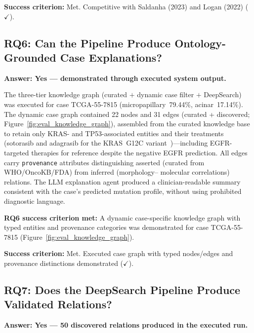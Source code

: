 \textbf{Success criterion:} Met.
Competitive with Saldanha (2023) and Logan (2022) ($\checkmark$).

\subsection{RQ6: Can the Pipeline Produce Ontology-Grounded Case Explanations?}
\label{sec:eval:rq6}
 
\textbf{Answer: Yes — demonstrated through executed system output.}
 
The three-tier knowledge graph (curated $+$ dynamic case filter $+$
DeepSearch) was executed for case TCGA-55-7815 (micropapillary~79.44\%,
acinar~17.14\%).
The dynamic case graph contained 22 nodes and 31 edges (curated +
discovered; Figure~\ref{fig:eval_knowledge_graph}), assembled from
the curated knowledge base to retain only KRAS- and TP53-associated
entities and their treatments (sotorasib and adagrasib for the
KRAS~G12C variant~\cite{skoulidis2021codebreak})---including
EGFR-targeted therapies for reference despite the negative EGFR
prediction.
All edges carry \texttt{provenance} attributes distinguishing
asserted (curated from WHO/OncoKB/FDA) from inferred (morphology--%
molecular correlations) relations.
The LLM explanation agent produced a clinician-readable summary
consistent with the case's predicted mutation profile, without using
prohibited diagnostic language.
 
\textbf{RQ6 success criterion met:} A dynamic case-specific knowledge
graph with typed entities and provenance categories was demonstrated
for case TCGA-55-7815 (Figure~\ref{fig:eval_knowledge_graph}).
 
\textbf{Success criterion:} Met.
Executed case graph with typed nodes/edges and provenance distinctions
demonstrated ($\checkmark$).
 
 
\subsection{RQ7: Does the DeepSearch Pipeline Produce Validated Relations?}
\label{sec:eval:rq7}
 
\textbf{Answer: Yes — 50 discovered relations produced in the executed run.}

